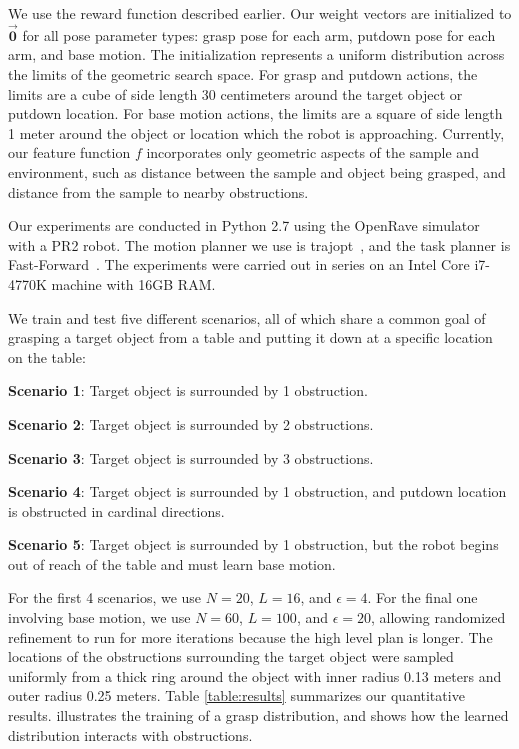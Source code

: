 We use the reward function described earlier. Our weight
vectors are initialized to $\vec{\mathbf{0}}$ for all pose parameter types: grasp pose
for each arm, putdown pose for each arm, and base motion.
The initialization represents a uniform distribution across the limits of the geometric search space.
For grasp and putdown actions, the limits are a cube of side length 30 centimeters
around the target object or putdown location. For base motion actions, the limits are a
square of side length 1 meter around the object or location which the robot is approaching.
Currently, our feature function $f$ incorporates only geometric aspects of the sample and environment,
such as distance between the sample and object being grasped, and distance from the sample to
nearby obstructions.

Our experiments are conducted in Python 2.7 using the OpenRave simulator~\cite{Diankov_2008_6117} with a PR2 robot.
The motion planner we use is trajopt~\cite{schulman2013finding}, and the task planner is Fast-Forward~\cite{FF}.
The experiments were carried out in series on an Intel Core i7-4770K machine
with 16GB RAM.

We train and test five different scenarios, all of which share a common goal of
grasping a target object from a table and putting it down at a specific location on the table:
\begin{tightlist}
\item[\textbf{Scenario 1}:] Target object is surrounded by 1 obstruction.
\item[\textbf{Scenario 2}:] Target object is surrounded by 2 obstructions.
\item[\textbf{Scenario 3}:] Target object is surrounded by 3 obstructions.
\item[\textbf{Scenario 4}:] Target object is surrounded by 1 obstruction,
and putdown location is obstructed in cardinal directions.
\item[\textbf{Scenario 5}:] Target object is surrounded by 1 obstruction,
but the robot begins out of reach of the table and must learn base motion.
\end{tightlist}

For the first 4 scenarios, we use $N = 20$, $L = 16$, and $\epsilon = 4$.
For the final one involving base motion, we use $N = 60$, $L = 100$, and $\epsilon = 20$,
allowing randomized refinement to run for more iterations because the high level plan
is longer. The locations of the obstructions surrounding the target object were
sampled uniformly from a thick ring around the object with inner radius 0.13 meters
and outer radius 0.25 meters. Table \ref{table:results} summarizes our quantitative results.
 illustrates the training of a grasp distribution, and 
shows how the learned distribution interacts with obstructions.

